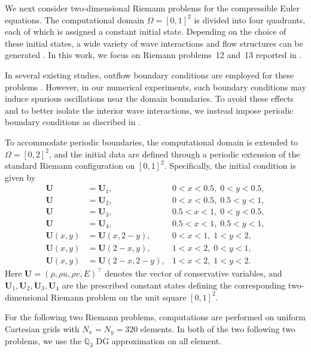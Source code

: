 \documentclass[fleqn,11pt]{amsart}
\begin{document}
{We next consider two-dimensional Riemann problems for the compressible
Euler equations. The computational domain $\Omega=[0,1]^2$ is divided
into four quadrants, each of which is assigned a constant initial
state. Depending on the choice of these initial states, a wide variety
of wave interactions and flow structures can be generated
\cite{lax1998solution,schulz1993numerical}. In this work, we focus on
Riemann problems~12 and~13 reported in \cite{lax1998solution}.

In several existing studies, outflow boundary conditions are employed
for these problems \cite{peng2025oedg}. However, in our numerical
experiments, such boundary conditions may induce spurious
oscillations near the domain boundaries. To avoid these effects and to better isolate
the interior wave interactions, we instead impose periodic boundary
conditions as discribed in \cite{guermond2011entropy_nonlinear}.

To accommodate periodic boundaries, the computational domain is
extended to $\Omega=[0,2]^2$, and the initial data are defined through
a periodic extension of the standard Riemann configuration on
$[0,1]^2$. Specifically, the initial condition is given by
\begin{equation}
\label{eq:riemann_ic}
\begin{aligned}
\bm U &= \bm U_1,
& 0<x<0.5,\; 0<y<0.5,\\
\bm U &= \bm U_2,
& 0<x<0.5,\; 0.5<y<1,\\
\bm U &= \bm U_3,
& 0.5<x<1,\; 0<y<0.5,\\
\bm U &= \bm U_4,
& 0.5<x<1,\; 0.5<y<1,\\
\bm U(x,y) &= \bm U(x,2-y),
& 0<x<1,\; 1<y<2,\\
\bm U(x,y) &= \bm U(2-x,y),
& 1<x<2,\; 0<y<1,\\
\bm U(x,y) &= \bm U(2-x,2-y),
& 1<x<2,\; 1<y<2.
\end{aligned}
\end{equation}
Here $\bm U=(\rho,\rho u,\rho v,E)^\top$ denotes the vector of
conservative variables, and $\bm U_1,\bm U_2,\bm U_3,\bm U_4$ are the
prescribed constant states defining the corresponding two-dimensional
Riemann problem on the unit square $[0,1]^2$.

For the following two Riemann problems, computations are performed on
uniform Cartesian grids with $N_x=N_y=320$ elements. In both of the two following two problems, we use the $\mathbb Q_3$ DG approximation on all
element. %

}
\end{document}
